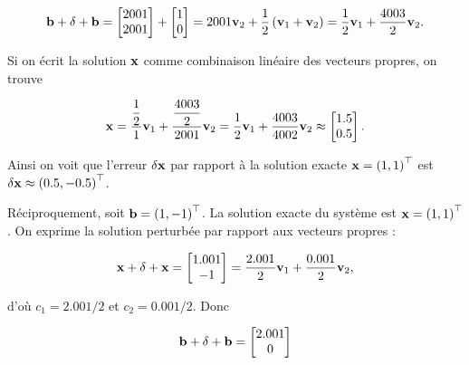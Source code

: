 \begin{enumerate}[label=\alph*)]
  \begin{equation*}
    \mathbf{b} + \delta + \mathbf{b}
    =   \begin{bmatrix}
          2001 \\
          2001
        \end{bmatrix} 
        +
        \begin{bmatrix}
          1 \\
          0
        \end{bmatrix} 
    = 2001 \mathbf{v}_{2} + \dfrac{1}{2} \left(\mathbf{v}_{1} + \mathbf{v}_{2}\right)
    = \dfrac{1}{2} \mathbf{v}_{1} + \dfrac{4003}{2} \mathbf{v}_{2}.
  \end{equation*}
  
  Si on écrit la solution $\mathbf{x}$ comme combinaison linéaire des vecteurs propres, on trouve
  
  \begin{equation*}
    \mathbf{x}
    = \dfrac{\dfrac{1}{2}}{1} \mathbf{v}_{1} + \dfrac{\dfrac{4003}{2}}{2001} \mathbf{v}_{2}
    = \dfrac{1}{2} \mathbf{v}_{1} + \dfrac{4003}{4002} \mathbf{v}_{2}
    \approx 
    \begin{bmatrix}
      1.5 \\
      0.5
    \end{bmatrix}. 
  \end{equation*}
  
  Ainsi on voit que l'erreur $\delta \mathbf{x}$ par rapport à la solution exacte $\mathbf{x} = \left(1, 1\right)^{\top}$ est $\delta \mathbf{x} \approx \left(0.5, -0.5\right)^{\top}$.
  
  Réciproquement, soit $\mathbf{b} = \left(1, -1\right)^{\top}$. La solution exacte du système est $\mathbf{x} = \left(1, 1\right)^{\top}$.
  On exprime la solution perturbée par rapport aux vecteurs propres :
  
  \begin{equation*}
    \mathbf{x} + \delta + \mathbf{x}
    =   \begin{bmatrix}
          1.001 \\
          -1
        \end{bmatrix} 
    = \dfrac{2.001}{2} \mathbf{v}_{1} + \dfrac{0.001}{2} \mathbf{v}_{2},
  \end{equation*}
  
  d'où $c_{1} = 2.001/2$ et $c_{2} = 0.001/2$. Donc 
  
  \begin{equation*}
    \mathbf{b} + \delta + \mathbf{b}
    =   \begin{bmatrix}
          2.001 \\
          0
        \end{bmatrix} 
  \end{equation*}
  

\end{enumerate}
